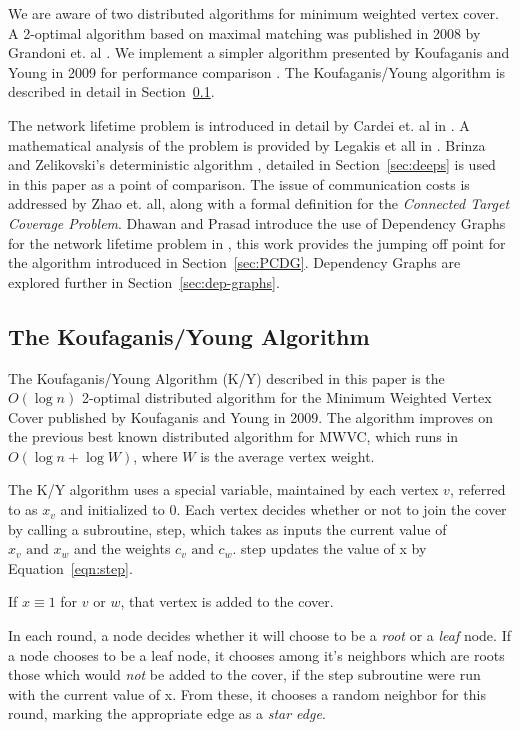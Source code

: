 We are aware of two distributed algorithms for minimum weighted vertex cover. A 2-optimal algorithm based on maximal matching was published in 2008 by Grandoni et. al \cite{1435381}. We implement a simpler algorithm presented by Koufaganis and Young in 2009 for performance comparison \cite{1582746}. The Koufaganis/Young algorithm is described in detail in Section~\ref{sec:k-y-alg}.

The network lifetime problem is introduced in detail by Cardei et. al in \cite{1498475}. A mathematical analysis of the problem is provided by Legakis et all in \cite{4697802}. Brinza and Zelikovski's deterministic algorithm \cite{1640702}, detailed in Section~\ref{sec:deeps} is used in this paper as a point of comparison. The issue of communication costs is addressed by Zhao et. all, along with a formal definition for the {\em Connected Target Coverage Problem}\cite{1514028}. Dhawan and Prasad introduce the use of Dependency Graphs for the network lifetime problem in \cite{978-3-540-77220-0_36}, this work provides the jumping off point for the algorithm introduced in Section~\ref{sec:PCDG}. Dependency Graphs are explored further in Section~\ref{sec:dep-graphs}.

\subsection{The Koufaganis/Young Algorithm}
\label{sec:k-y-alg}

The Koufaganis/Young Algorithm (K/Y) described in this paper is the $O(\log n)$ 2-optimal distributed algorithm for the Minimum Weighted Vertex Cover published by Koufaganis and Young in 2009\cite{1582746}. The algorithm improves on the previous best known distributed algorithm for MWVC, which runs in $O(\log n + \log W)$, where  $W$ is the average vertex weight\cite{1435381}.

The K/Y algorithm uses a special variable, maintained by each vertex $v$, referred to as $x_v$ and initialized to 0. Each vertex decides whether or not to join the cover by calling a subroutine, {\ttfamily step}, which takes as inputs the current value of $x_v \text{ and } x_w$ and the weights $c_v \text{ and } c_w$. {\ttfamily step} updates the value of x by Equation~\ref{eqn:step}.



If $x \equiv 1 $ for $v \text{ or } w$, that vertex is added to the cover.

In each round, a node decides whether it will choose to be a {\em root} or a {\em leaf} node. If a node chooses to be a leaf node, it chooses among it's neighbors which are roots those which would {\em not} be added to the cover, if the {\ttfamily step} subroutine were run with the current value of x. From these, it chooses a random neighbor for this round, marking the appropriate edge as a {\em star edge}.

